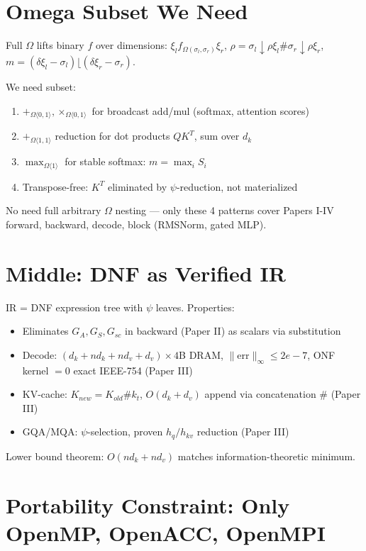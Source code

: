 \documentclass[11pt,a4paper]{article}
\begin{document}
\section{Omega Subset We Need}

Full $\Omega$ lifts binary $f$ over dimensions: $\xi_l f_{\Omega(\sigma_l,\sigma_r)}\xi_r$, $\rho = \sigma_l\downarrow\rho\xi_l \# \sigma_r\downarrow\rho\xi_r$, $m=(\delta\xi_l-\sigma_l)\lfloor(\delta\xi_r-\sigma_r)$.

We need subset:
\begin{enumerate}
\item $+_{\Omega\langle0,1\rangle}, \times_{\Omega\langle0,1\rangle}$ for broadcast add/mul (softmax, attention scores)
\item $+_{\Omega\langle1,1\rangle}$ reduction for dot products $QK^T$, sum over $d_k$
\item $\max_{\Omega\langle1\rangle}$ for stable softmax: $m=\max_i S_i$
\item Transpose-free: $K^T$ eliminated by $\psi$-reduction, not materialized
\end{enumerate}

No need full arbitrary $\Omega$ nesting — only these 4 patterns cover Papers I-IV forward, backward, decode, block (RMSNorm, gated MLP).

\section{Middle: DNF as Verified IR}

IR = DNF expression tree with $\psi$ leaves. Properties:
\begin{itemize}
\item Eliminates $G_A,G_S,G_{sc}$ in backward (Paper II) as scalars via substitution
\item Decode: $(d_k+nd_k+nd_v+d_v)\times4$B DRAM, $\|\text{err}\|_\infty\le2e-7$, ONF kernel $=0$ exact IEEE-754 (Paper III)
\item KV-cache: $K_{new}=K_{old}\# k_t$, $O(d_k+d_v)$ append via concatenation $\#$ (Paper III)
\item GQA/MQA: $\psi$-selection, proven $h_q/h_{kv}$ reduction (Paper III)
\end{itemize}

Lower bound theorem: $O(nd_k+nd_v)$ matches information-theoretic minimum.

\section{Portability Constraint: Only OpenMP, OpenACC, OpenMPI}
\end{document}
